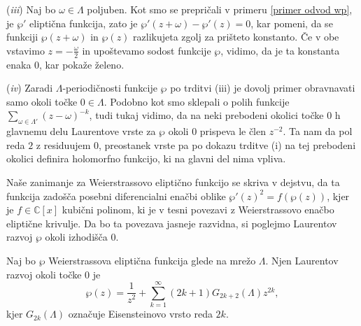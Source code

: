 \documentclass[mat1]{fmfdelo}
\numberwithin{equation}{section}
\newcommand{\C}{\mathbb C}
\newcommand{\om}{\omega}
\theoremstyle{definition}
\begin{document}
\begin{dokaz}
    (\emph{iii}) Naj bo $\om\in \Lambda$ poljuben. Kot smo se prepričali v primeru \ref{primer odvod wp}, je $\wp'$ eliptična funkcija, zato je $\wp'(z + \om) - \wp'(z) = 0$, kar pomeni, da se funkciji $\wp(z + \om)$ in $\wp(z)$ razlikujeta zgolj za prišteto konstanto. Če v obe vstavimo $z = -\frac{\omega}{2}$ in upoštevamo sodost funkcije $\wp$, vidimo, da je ta konstanta enaka $0$, kar pokaže želeno.

    (\emph{iv}) Zaradi $\Lambda$-periodičnosti funkcije $\wp$ po trditvi (iii) je dovolj primer obravnavati samo okoli točke $0\in\Lambda$. Podobno kot smo sklepali o polih funkcije $\sum_{\om\in\Lambda'}(z-\om)^{-k}$, tudi tukaj vidimo, da na neki prebodeni okolici točke $0$ h glavnemu delu Laurentove vrste za $\wp$ okoli $0$ prispeva le člen $z^{-2}$. Ta nam da pol reda $2$ z residuujem $0$, preostanek vrste pa po dokazu trditve (i) na tej prebodeni okolici definira holomorfno funkcijo, ki na glavni del nima vpliva.  
\end{dokaz}

Naše zanimanje za Weierstrassovo eliptično funkcijo se skriva v dejstvu, da ta funkcija zadošča posebni diferencialni enačbi oblike $\wp'(z)^2 = f(\wp(z))$, kjer je $f \in \C[x]$ kubični polinom, ki je v tesni povezavi z Weierstrassovo enačbo eliptične krivulje. Da bo ta povezava jasneje razvidna, si poglejmo Laurentov razvoj $\wp$ okoli izhodišča $0$. 

\begin{lema}
    Naj bo $\wp$ Weierstrassova eliptična funkcija glede na mrežo $\Lambda$. Njen Laurentov razvoj okoli točke $0$ je
    \begin{equation}
        \label{eq: Laurentov razvoj wp}
        \wp(z) = \frac{1}{z^2} + \sum_{k = 1}^\infty(2k + 1)G_{2k + 2}(\Lambda)z^{2k},  
    \end{equation}
    kjer $G_{2k}(\Lambda)$ označuje Eisensteinovo vrsto reda $2k$.
\end{lema}
\end{document}
